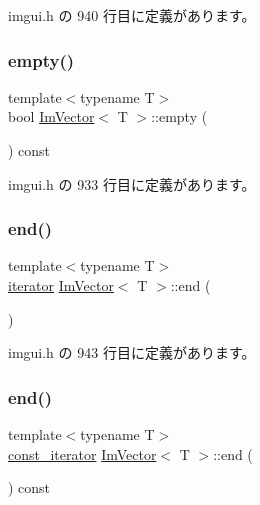  imgui.\+h の 940 行目に定義があります。

\mbox{\label{class_im_vector_aa53e48a5272f4bad1099368769514ff1}} 
\subsubsection{\texorpdfstring{empty()}{empty()}}
{\footnotesize\ttfamily template$<$typename T$>$ \\
bool \mbox{\hyperlink{class_im_vector}{Im\+Vector}}$<$ T $>$\+::empty (\begin{DoxyParamCaption}{ }\end{DoxyParamCaption}) const\hspace{0.3cm}{\ttfamily [inline]}}



 imgui.\+h の 933 行目に定義があります。

\mbox{\label{class_im_vector_a947fbc3b1d8c1997e51ae6caab440379}} 
\subsubsection{\texorpdfstring{end()}{end()}\hspace{0.1cm}{\footnotesize\ttfamily [1/2]}}
{\footnotesize\ttfamily template$<$typename T$>$ \\
\mbox{\hyperlink{class_im_vector_a74b5478f1f6fd471cc71219bce483db6}{iterator}} \mbox{\hyperlink{class_im_vector}{Im\+Vector}}$<$ T $>$\+::end (\begin{DoxyParamCaption}{ }\end{DoxyParamCaption})\hspace{0.3cm}{\ttfamily [inline]}}



 imgui.\+h の 943 行目に定義があります。

\mbox{\label{class_im_vector_a06efa87357864d1c130f0f400eeccf8d}} 
\subsubsection{\texorpdfstring{end()}{end()}\hspace{0.1cm}{\footnotesize\ttfamily [2/2]}}
{\footnotesize\ttfamily template$<$typename T$>$ \\
\mbox{\hyperlink{class_im_vector_aedeac9c5080f9d6ce96ae837768ee4c4}{const\+\_\+iterator}} \mbox{\hyperlink{class_im_vector}{Im\+Vector}}$<$ T $>$\+::end (\begin{DoxyParamCaption}{ }\end{DoxyParamCaption}) const\hspace{0.3cm}{\ttfamily [inline]}}



